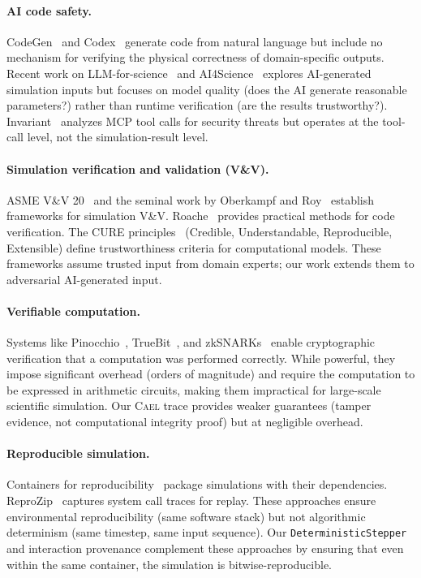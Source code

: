 \documentclass[letterpaper,twocolumn,10pt]{article}
\newcommand{\cael}{\textsc{Cael}}
\begin{document}
\paragraph{AI code safety.}
CodeGen~\cite{li2023codegeneration} and Codex~\cite{chen2021codex}
generate code from natural language but include no mechanism for
verifying the physical correctness of domain-specific outputs.
Recent work on LLM-for-science~\cite{buehler2024mechgpt} and
AI4Science~\cite{ai4science2023} explores AI-generated simulation
inputs but focuses on model quality (does the AI generate reasonable
parameters?) rather than runtime verification (are the results
trustworthy?). Invariant~\cite{invariantlabs2025} analyzes MCP tool
calls for security threats but operates at the tool-call level, not
the simulation-result level.

\paragraph{Simulation verification and validation (V\&V).}
ASME V\&V 20~\cite{asme2009vv20} and the seminal work by
Oberkampf and Roy~\cite{oberkampf2010verification} establish
frameworks for simulation V\&V. Roache~\cite{roache1998verification}
provides practical methods for code verification. The CURE
principles~\cite{cure2024} (Credible, Understandable, Reproducible,
Extensible) define trustworthiness criteria for computational
models. These frameworks assume trusted input from domain experts;
our work extends them to adversarial AI-generated input.

\paragraph{Verifiable computation.}
Systems like Pinocchio~\cite{parno2013pinocchio},
TrueBit~\cite{teutsch2017truebit}, and zkSNARKs~\cite{bitansky2012extractable}
enable cryptographic verification that a computation was performed
correctly. While powerful, they impose significant overhead
(orders of magnitude) and require the computation to be expressed
in arithmetic circuits, making them impractical for large-scale
scientific simulation. Our \cael{} trace provides weaker guarantees
(tamper evidence, not computational integrity proof) but at negligible
overhead.

\paragraph{Reproducible simulation.}
Containers for reproducibility~\cite{boettiger2015docker} package
simulations with their dependencies. ReproZip~\cite{chirigati2016reprozip}
captures system call traces for replay. These approaches ensure
environmental reproducibility (same software stack) but not
algorithmic determinism (same timestep, same input sequence). Our
\texttt{DeterministicStepper} and interaction provenance complement
these approaches by ensuring that even within the same container,
the simulation is bitwise-reproducible.
\end{document}
